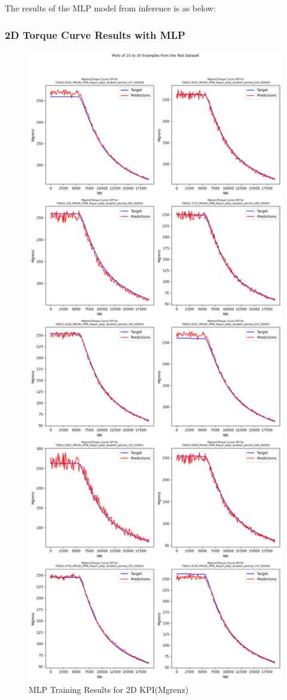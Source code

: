 \documentclass{report} %
\begin{document}
The results of the \ac{MLP} model from inference is as below: \\

\subsubsection*{2D Torque Curve Results with \ac{MLP}}

\begin{figure}[H]
    \centering
    \includegraphics[width=1\textwidth]{./ReportImages/KPI2D_predictions.png} 
    \caption{MLP Training Results for 2D KPI(Mgrenz)} 
    \label{fig:MLP Training Results for 2D KPI(Mgrenz)}
\end{figure}
\end{document}

